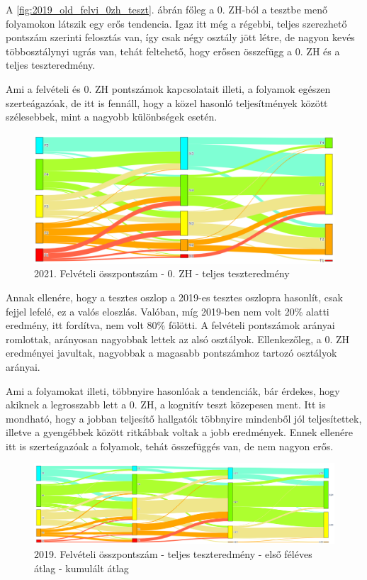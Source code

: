 \documentclass[12pt]{article}
\begin{document}
A \ref{fig:2019_old_felvi_0zh_teszt}. ábrán főleg a 0. ZH-ból a tesztbe menő folyamokon látszik egy erős tendencia. Igaz itt még a régebbi, teljes szerezhető pontszám szerinti felosztás van, így csak négy osztály jött létre, de nagyon kevés többosztálynyi ugrás van, tehát feltehető, hogy erősen összefügg a 0. ZH és a teljes teszteredmény.

Ami a felvételi és 0. ZH pontszámok kapcsolatait illeti, a folyamok egészen szerteágazóak, de itt is fennáll, hogy a közel hasonló teljesítmények között szélesebbek, mint a nagyobb különbségek esetén.

\begin{figure}[H]
\centering
\includegraphics[scale=0.573]{kepek/2021_old_felvi_0zh_teszt.png}
\caption{2021. Felvételi összpontszám - 0. ZH - teljes teszteredmény}
\label{fig:2021_old_felvi_0zh_teszt}
\end{figure}

Annak ellenére, hogy a tesztes oszlop a 2019-es tesztes oszlopra hasonlít, csak fejjel lefelé, ez a valós eloszlás. Valóban, míg 2019-ben nem volt 20\% alatti eredmény, itt fordítva, nem volt 80\% fölötti. A felvételi pontszámok arányai romlottak, arányosan nagyobbak lettek az alsó osztályok. Ellenkezőleg, a 0. ZH eredményei javultak, nagyobbak a magasabb pontszámhoz tartozó osztályok arányai. 

Ami a folyamokat illeti, többnyire hasonlóak a tendenciák, bár érdekes, hogy akiknek a legrosszabb lett a 0. ZH, a kognitív teszt közepesen ment. Itt is mondható, hogy a jobban teljesítő hallgatók többnyire mindenből jól teljesítettek, illetve a gyengébbek között ritkábbak voltak a jobb eredmények. Ennek ellenére itt is szerteágazóak a folyamok, tehát összefüggés van, de nem nagyon erős.


\begin{figure}[H]
\centering
\includegraphics[scale=0.6]{kepek/2019_felvi_teszt_atlag_kumatlag.png}
\caption{2019. Felvételi összpontszám - teljes teszteredmény - első féléves átlag - kumulált átlag}
\label{fig:2019_felvi_teszt_atlag_kumatlag}
\end{figure}
\end{document}
